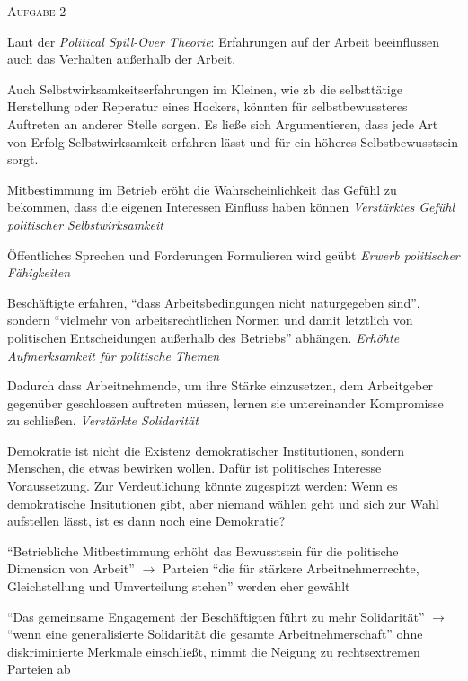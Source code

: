\textsc{Aufgabe 2} \quad
\begin{myenumerate}
    \item Laut der \emph{Political Spill-Over Theorie}: Erfahrungen auf der Arbeit beeinflussen auch das Verhalten außerhalb der Arbeit. 
    \item Auch Selbstwirksamkeitserfahrungen im Kleinen, wie \gls{zb} die selbsttätige Herstellung oder Reperatur eines Hockers, könnten für selbstbewussteres Auftreten an anderer Stelle sorgen. Es ließe sich Argumentieren, dass jede Art von Erfolg Selbstwirksamkeit erfahren lässt und für ein höheres Selbstbewusstsein sorgt. 
    \item 
    \begin{myitemize}
        \item Mitbestimmung im Betrieb eröht die Wahrscheinlichkeit das Gefühl zu bekommen, dass die eigenen Interessen Einfluss haben können \emph{Verstärktes Gefühl politischer Selbstwirksamkeit}
        \item Öffentliches Sprechen und Forderungen Formulieren wird geübt \emph{Erwerb politischer Fähigkeiten}
        \item Beschäftigte erfahren, \enquote{dass Arbeitsbedingungen nicht naturgegeben sind}, sondern \enquote{vielmehr von arbeitsrechtlichen Normen und damit letztlich von politischen Entscheidungen außerhalb des Betriebs} abhängen. \emph{Erhöhte Aufmerksamkeit für politische Themen}
        \item Dadurch dass Arbeitnehmende, um ihre Stärke einzusetzen, dem Arbeitgeber gegenüber geschlossen auftreten müssen, lernen sie untereinander Kompromisse zu schließen. \emph{Verstärkte Solidarität}
    \end{myitemize}
    \item Demokratie ist nicht die Existenz demokratischer Institutionen, sondern Menschen, die etwas bewirken wollen. Dafür ist politisches Interesse Voraussetzung. Zur Verdeutlichung könnte zugespitzt werden: Wenn es demokratische Insitutionen gibt, aber niemand wählen geht und sich zur Wahl aufstellen lässt, ist es dann noch eine Demokratie?
    \item \enquote{Betriebliche Mitbestimmung erhöht das Bewusstsein für die politische Dimension von Arbeit} $\rightarrow$ Parteien \enquote{die für stärkere Arbeitnehmerrechte, Gleichstellung und Umverteilung stehen} werden eher gewählt 
    
    \enquote{Das gemeinsame Engagement der Beschäftigten führt zu mehr Solidarität} $\rightarrow$ \enquote{wenn eine generalisierte Solidarität die gesamte Arbeitnehmerschaft} ohne diskriminierte Merkmale einschließt, nimmt die Neigung zu rechtsextremen Parteien ab 
\end{myenumerate}


